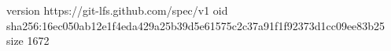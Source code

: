 version https://git-lfs.github.com/spec/v1
oid sha256:16ec050ab12e1f4eda429a25b39d5e61575c2c37a91f1f92373d1cc09ee83b25
size 1672

